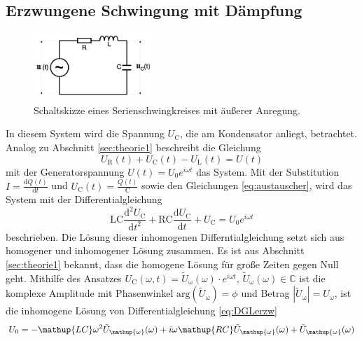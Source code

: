 \subsection{Erzwungene Schwingung mit Dämpfung}
\label{sec:theorie2}
\begin{figure}[ht]
	\centering
	\includegraphics[width=0.4\textwidth]{Bilder/Maschenfoto2.png}
	\caption{Schaltskizze eines Serienschwingkreises mit äußerer Anregung. \cite{v354}}
	\label{fig:schaltkreis_erzwungen}
\end{figure}
In diesem System wird die Spannung $U_\text{C}$, die am Kondensator anliegt, betrachtet.
Analog zu Abschnitt \ref{sec:theorie1} beschreibt die Gleichung
\begin{equation}
	U_\text{R}(t)+U_\text{C}(t)-U_\text{L}(t)=U(t)
\end{equation}
mit der Generatorspannung $U(t)=U_0 e^{i\omega t}$ das System.
Mit der Substitution
$I=\frac{\mathup{d}Q(t)}{\mathup{d}t}$ und $U_\text{C}(t) = \frac{Q(t)}{\text{C}}$ sowie den Gleichungen \eqref{eq:austauscher},
wird das System mit der Differentialgleichung 
\begin{equation}
	\mathup{LC}\frac{\mathup{d^2}U_\mathup{C}}{\mathup{d}t^2} +\mathup{RC}\frac{\mathup{d}U_\mathup{C}}{\mathup{d}t} +U_\mathup{C} =U_0 e^{i\omega t}
	\label{eq:DGLerzw}
\end{equation}
beschrieben.
Die Lösung dieser inhomogenen Differntialgleichung setzt sich aus homogener und inhomogener Lösung zusammen.
Es ist aus Abschnitt \ref{sec:theorie1} bekannt, dass die homogene Lösung für große Zeiten gegen Null geht.
Mithilfe des Ansatzes $U_\mathup{C}(\omega,t)= \tilde{U}_\mathup{\omega}(\omega)\cdot e^{i\omega t}$,
$\tilde{U}_\mathup{\omega}(\omega)\in\mathbb{C}$ ist die komplexe Amplitude mit Phasenwinkel $\mathup{arg}(\tilde{U}_\mathup{\omega})=\phi$ und Betrag $|\tilde{U}_\mathup{\omega}|=U_\mathup{\omega}$, ist die inhomogene Lösung von Differentialgleichung \eqref{eq:DGLerzw}
\begin{equation}
	U_0 = - \mathup{LC}\omega^2 \tilde{U}_\mathup{\omega}(\omega) + i\omega\mathup{RC}\tilde{U}_\mathup{\omega}(\omega) + \tilde{U}_\mathup{\omega}(\omega)\\
\end{equation}
